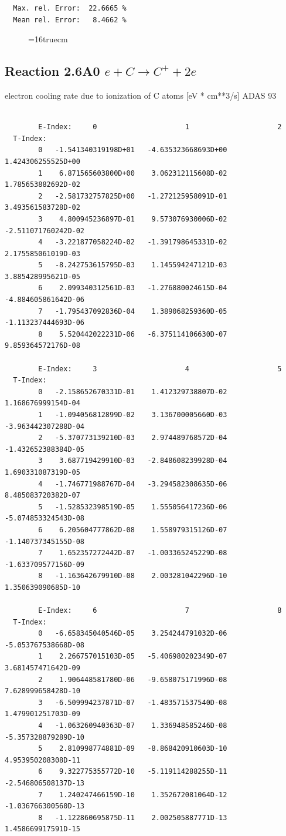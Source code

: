 \documentclass[12pt,dvips]{article}
\begin{document}
\begin{small}
\begin{verbatim}
  Max. rel. Error:  22.6665 %
  Mean rel. Error:   8.4662 %
\end{verbatim}\end{small}
\begin{figure} \label{2.3.13aer}
\epsfxsize=16truecm
\end{figure}
\newpage

\subsection{
  Reaction 2.6A0  $e + C  \rightarrow C^+   + 2e $
}
electron cooling rate due to ionization of C atoms [eV * cm**3/s]
ADAS 93

\begin{small}\begin{verbatim}

        E-Index:     0                     1                     2
  T-Index:
        0   -1.541340319198D+01   -4.635323668693D+00    1.424306255525D+00
        1    6.871565603800D+00    3.062312115608D-02    1.785653882692D-02
        2   -2.581732757825D+00   -1.272125958091D-01    3.493561583728D-02
        3    4.800945236897D-01    9.573076930006D-02   -2.511071760242D-02
        4   -3.221877058224D-02   -1.391798645331D-02    2.175585061019D-03
        5   -8.242753615795D-03    1.145594247121D-03    3.885428995621D-05
        6    2.099340312561D-03   -1.276880024615D-04   -4.884605861642D-06
        7   -1.795437092836D-04    1.389068259360D-05   -1.113237444693D-06
        8    5.520442022231D-06   -6.375114106630D-07    9.859364572176D-08

        E-Index:     3                     4                     5
  T-Index:
        0   -2.158652670331D-01    1.412329738807D-02    1.168676999154D-04
        1   -1.094056812899D-02    3.136700005660D-03   -3.963442307288D-04
        2   -5.370773139210D-03    2.974489768572D-04   -1.432652388384D-05
        3    3.687719429910D-03   -2.848608239928D-04    1.690331087319D-05
        4   -1.746771988767D-04   -3.294582308635D-06    8.485083720382D-07
        5   -1.528532398519D-05    1.555056417236D-06   -5.074853324543D-08
        6    6.205604777862D-08    1.558979315126D-07   -1.140737345155D-08
        7    1.652357272442D-07   -1.003365245229D-08   -1.633709577156D-09
        8   -1.163642679910D-08    2.003281042296D-10    1.350639090685D-10

        E-Index:     6                     7                     8
  T-Index:
        0   -6.658345040546D-05    3.254244791032D-06   -5.053767538668D-08
        1    2.266757015103D-05   -5.406980202349D-07    3.681457471642D-09
        2    1.906448581780D-06   -9.658075171996D-08    7.628999658428D-10
        3   -6.509994237871D-07   -1.483571537540D-08    1.479901251703D-09
        4   -1.063260940363D-07    1.336948585246D-08   -5.357328879289D-10
        5    2.810998774881D-09   -8.868420910603D-10    4.953950208308D-11
        6    9.322775355772D-10   -5.119114288255D-11   -2.546806508137D-13
        7    1.240247466159D-10    1.352672081064D-12   -1.036766300560D-13
        8   -1.122860695875D-11    2.002505887771D-13    1.458669917591D-15


\end{verbatim}
\end{small}
\end{document}
